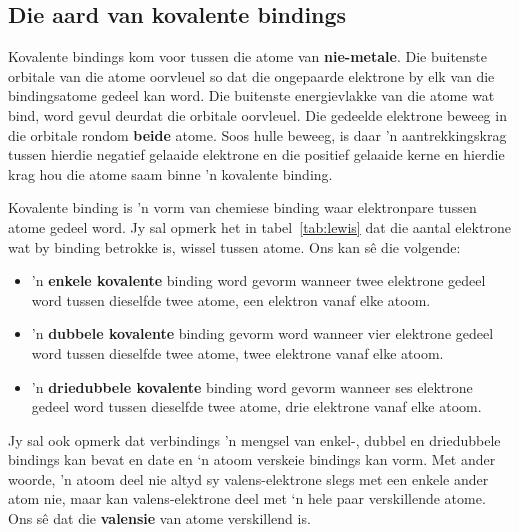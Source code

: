             \subsection*{Die aard van kovalente bindings}
            \nopagebreak
        \label{m38704*id138956}
Kovalente bindings kom voor tussen die atome van \textbf{nie-metale}. Die buitenste orbitale van die atome oorvleuel so dat die ongepaarde elektrone by elk van die bindingsatome gedeel kan word. Die buitenste energievlakke van die atome wat bind, word gevul deurdat die orbitale oorvleuel. Die gedeelde elektrone beweeg in die orbitale rondom \textbf{beide} atome. Soos hulle beweeg, is daar 'n aantrekkingskrag tussen hierdie negatief gelaaide elektrone en die positief gelaaide kerne en hierdie krag hou die atome saam binne 'n kovalente binding.\par 
\label{m38704*fhsst!!!underscore!!!id94}
 {Kovalente binding is 'n vorm van chemiese binding waar elektronpare tussen atome gedeel word.} 
\label{m38704*id139505}Jy sal opmerk het in tabel~\ref{tab:lewis} dat die aantal elektrone wat by binding betrokke is, wissel tussen atome. Ons kan s\^{e} die volgende:
\begin{itemize}
 \item 'n \textbf{enkele kovalente} binding word gevorm wanneer twee elektrone gedeel word tussen dieselfde twee atome, een elektron vanaf elke atoom. 
 \item 'n \textbf{dubbele kovalente} binding gevorm word wanneer vier elektrone gedeel word tussen dieselfde twee atome, twee elektrone vanaf elke atoom.
 \item 'n \textbf{driedubbele kovalente} binding word gevorm wanneer ses elektrone gedeel word tussen dieselfde twee atome, drie elektrone vanaf elke atoom.
\end{itemize}
Jy sal ook opmerk dat verbindings 'n mengsel van enkel-, dubbel en driedubbele bindings kan bevat en date en ‘n atoom verskeie bindings kan vorm. Met ander woorde, 'n atoom deel nie altyd sy valens-elektrone slegs met een enkele ander atom nie, maar kan valens-elektrone deel met ‘n hele paar verskillende atome.\\
Ons s\^{e} dat die \textbf{valensie} van atome verskillend is. 
